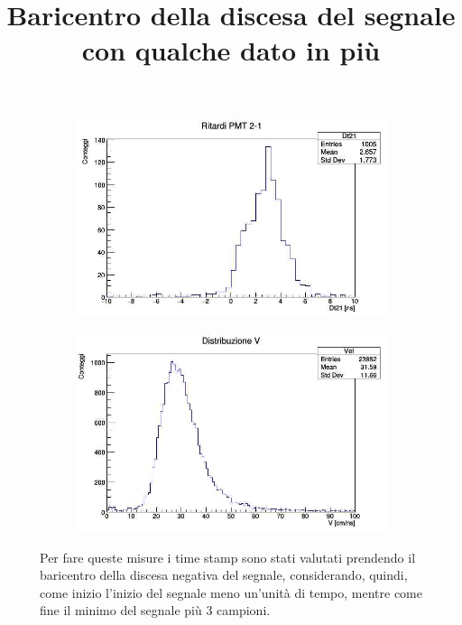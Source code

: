 \documentclass[a4paper,twocolumn]{article}
\begin{document}
\begin{figure}[H]
     \centering
     \title{Baricentro della discesa del segnale con qualche dato in più}
     \begin{center}
     \begin{subfigure}[b]{0.4\textwidth}
         \centering
         \includegraphics[width=\textwidth]{./immagini/TimeOfFlight/Rit21Fore.jpg}
         \caption{}
         \label{fig:Dt21ForeA}
     \end{subfigure}
     \hfill
     \begin{subfigure}[b]{0.4\textwidth}
         \centering
         \includegraphics[width=\textwidth]{./immagini/TimeOfFlight/VFore.jpg}
         \caption{}
         \label{fig:VForeA}
     \end{subfigure}
     \end{center}
     \caption{Per fare queste misure i time stamp sono stati valutati prendendo il baricentro della discesa negativa del segnale, considerando, quindi, come inizio l'inizio del segnale meno un'unità di tempo, mentre come fine il minimo del segnale più 3 campioni.}        
     \label{fig:ForeA}
\end{figure}
\end{document}
